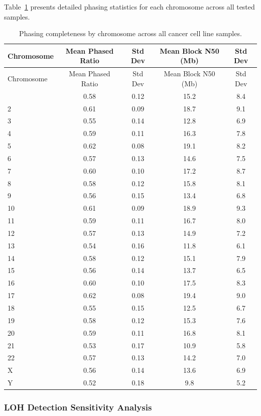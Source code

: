 \documentclass[pdflatex,sn-nature]{sn-jnl}
\begin{document}
Table~\ref{tab:phasing-by-chromosome} presents detailed phasing statistics for each chromosome across all tested samples.

\begin{longtable}[]{@{}lcccc@{}}
\caption{Phasing completeness by chromosome across all cancer cell line samples.}
\label{tab:phasing-by-chromosome} \\
\toprule
Chromosome & Mean Phased Ratio & Std Dev & Mean Block N50 (Mb) & Std Dev \\
\midrule
\endfirsthead
\toprule
Chromosome & Mean Phased Ratio & Std Dev & Mean Block N50 (Mb) & Std Dev \\
\midrule
\endhead
\bottomrule
\endlastfoot
1 & 0.58 & 0.12 & 15.2 & 8.4 \\
2 & 0.61 & 0.09 & 18.7 & 9.1 \\
3 & 0.55 & 0.14 & 12.8 & 6.9 \\
4 & 0.59 & 0.11 & 16.3 & 7.8 \\
5 & 0.62 & 0.08 & 19.1 & 8.2 \\
6 & 0.57 & 0.13 & 14.6 & 7.5 \\
7 & 0.60 & 0.10 & 17.2 & 8.7 \\
8 & 0.58 & 0.12 & 15.8 & 8.1 \\
9 & 0.56 & 0.15 & 13.4 & 6.8 \\
10 & 0.61 & 0.09 & 18.9 & 9.3 \\
11 & 0.59 & 0.11 & 16.7 & 8.0 \\
12 & 0.57 & 0.13 & 14.9 & 7.2 \\
13 & 0.54 & 0.16 & 11.8 & 6.1 \\
14 & 0.58 & 0.12 & 15.1 & 7.9 \\
15 & 0.56 & 0.14 & 13.7 & 6.5 \\
16 & 0.60 & 0.10 & 17.5 & 8.3 \\
17 & 0.62 & 0.08 & 19.4 & 9.0 \\
18 & 0.55 & 0.15 & 12.5 & 6.7 \\
19 & 0.58 & 0.12 & 15.3 & 7.6 \\
20 & 0.59 & 0.11 & 16.8 & 8.1 \\
21 & 0.53 & 0.17 & 10.9 & 5.8 \\
22 & 0.57 & 0.13 & 14.2 & 7.0 \\
X & 0.56 & 0.14 & 13.6 & 6.9 \\
Y & 0.52 & 0.18 & 9.8 & 5.2 \\
\end{longtable}

\subsubsection{LOH Detection Sensitivity Analysis}
\end{document}
